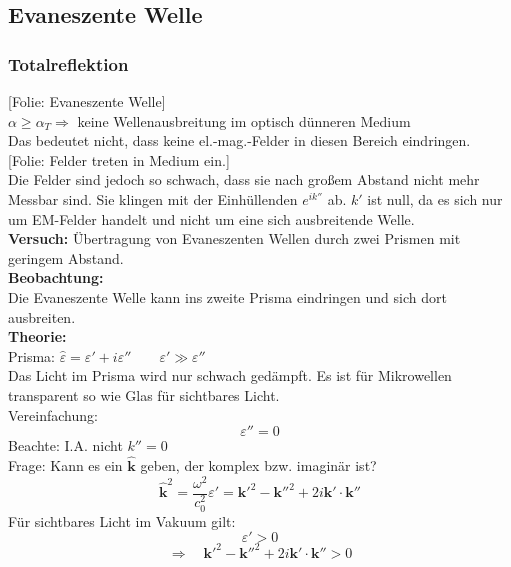 \documentclass[titlepage,11pt,a4paper,ngerman]{report}
\newcommand{\folie}[1]{\color{gray}[Folie: #1]\color{black}}
\newcommand{\versuch}[1]{\color{red!50!black} \textbf{Versuch:} \color{black} #1\\ }
\renewcommand{\vec}[1]{\boldsymbol{#1}}
\newcommand{\lcom}[1]{\color{MidnightBlue}#1\color{black}}
\renewcommand{\epsilon}{\varepsilon}
\begin{document}

\subsection{Evaneszente Welle}

\subsubsection{Totalreflektion}

\folie{Evaneszente Welle}\\
$ \alpha \ge \alpha_T \Rightarrow $ keine Wellenausbreitung im optisch dünneren Medium\\[5pt]
Das bedeutet nicht, dass keine el.-mag.-Felder in diesen Bereich eindringen.\\
\folie{Felder treten in Medium ein.}\\
\lcom{Die Felder sind jedoch so schwach, dass sie nach großem Abstand nicht mehr Messbar sind. Sie klingen mit der Einhüllenden $ e^{i k''} $ ab. $ k' $ ist null, da es sich nur um EM-Felder handelt und nicht um eine sich ausbreitende Welle.}\\
\versuch{Übertragung von Evaneszenten Wellen durch zwei Prismen mit geringem Abstand.}
\textbf{Beobachtung:}\\
Die Evaneszente Welle kann ins zweite Prisma eindringen und sich dort ausbreiten.\\
\textbf{Theorie:}\\
Prisma: $ \hat{\epsilon} = \epsilon' + i \epsilon''  \qquad \epsilon' \gg \epsilon''$\\
Das Licht im Prisma wird nur schwach gedämpft. Es ist für Mikrowellen transparent so wie Glas für sichtbares Licht.\\
Vereinfachung:
\begin{equation*}
\epsilon'' = 0
\end{equation*}
Beachte: I.A. nicht $ k'' = 0 $\\[5pt]
Frage: Kann es ein $ \hat{\vec{k}} $ geben, der komplex bzw. imaginär ist?
\begin{equation*}
\hat{\vec{k}}^2 = \frac{\omega^2}{c_0^2} \epsilon' = \vec{k}'^2 - \vec{k}''^2 + 2 i \vec{k}' \cdot \vec{k}''
\end{equation*}
Für sichtbares Licht im Vakuum gilt:
\begin{equation*}
\epsilon' > 0
\end{equation*}
\begin{equation*}
\Rightarrow \quad \vec{k}'^2 - \vec{k}''^2 + 2 i \vec{k}' \cdot \vec{k}'' > 0
\end{equation*}
\end{document}
